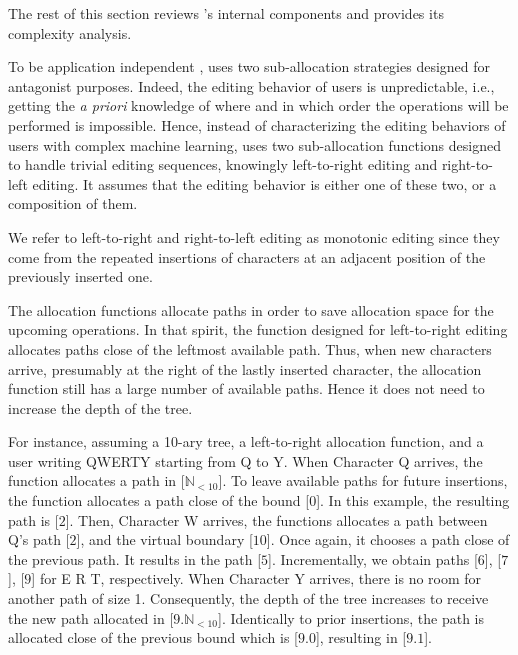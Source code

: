 The rest of this section reviews \LSEQ's internal components and provides its
complexity analysis.

\begin{asparadesc}
\item [To be application independent], \LSEQ uses two sub-allocation strategies
  designed for antagonist purposes. Indeed, the editing behavior of users is
  unpredictable, i.e., getting the \emph{a priori} knowledge of where and in which
  order the operations will be performed is impossible. Hence, instead of
  characterizing the editing behaviors of users with complex machine learning,
  \LSEQ uses two sub-allocation functions designed to handle trivial editing
  sequences, knowingly left-to-right editing and right-to-left editing. It
  assumes that the editing behavior is either one of these two, or a composition
  of them.

  We refer to left-to-right and right-to-left editing as monotonic editing since
  they come from the repeated insertions of characters at an adjacent position of
  the previously inserted one.
  
  The allocation functions allocate paths in order to save allocation space for
  the upcoming operations. In that spirit, the function designed for
  left-to-right editing allocates paths close of the leftmost available path.
  Thus, when new characters arrive, presumably at the right of the lastly
  inserted character, the allocation function still has a large number of
  available paths. Hence it does not need to increase the depth of the tree.

  For instance, assuming a 10-ary tree, a left-to-right allocation function, and
  a user writing QWERTY starting from Q to Y. When Character Q arrives,
  the function allocates a path in [$\mathbb{N}_{<10}$]. To leave available
  paths for future insertions, the function allocates a path close of the bound
  [$0$]. In this example, the resulting path is [$2$]. Then, Character W
  arrives, the functions allocates a path between Q's path [$2$], and the
  virtual boundary [$10$]. Once again, it chooses a path close of the previous
  path. It results in the path [$5$]. Incrementally, we obtain paths [$6$],
  [$7$], [$9$] for E R T, respectively. When Character Y arrives, there is no
  room for another path of size 1. Consequently, the depth of the tree increases
  to receive the new path allocated in [$9.\mathbb{N}_{<10}$]. Identically to
  prior insertions, the path is allocated close of the previous bound which is
  [$9.0$], resulting in [$9.1$].


\end{asparadesc}
